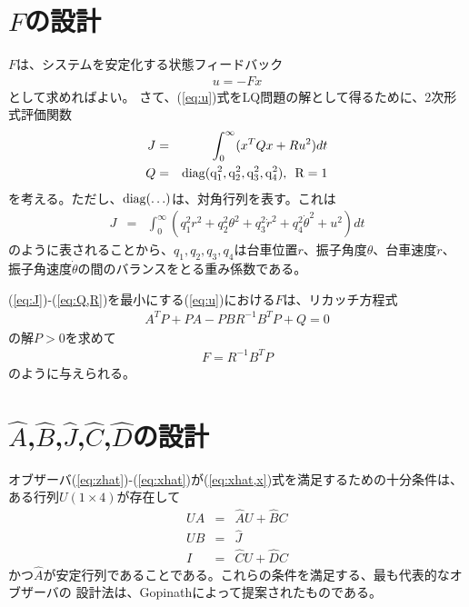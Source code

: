 \documentclass[a4j,11pt,twoside]{ujbook}
\begin{document}
	\section{$F$の設計}
		$F$は、システムを安定化する状態フィードバック
		\begin{eqnarray}
			u = -Fx
			\label{eq:u}
		\end{eqnarray}
		として求めればよい。
		さて、(\ref{eq:u})式をLQ問題の解として得るために、2次形式評価関数
		\begin{eqnarray}
			J &=& \int_0^\infty (x^TQx + Ru^2) dt
			\label{eq:J}\\
			Q &=& \rm{diag}(q^2_1,q^2_2,q^2_3,q^2_4), \,\,\, R = 1
			\label{eq:Q,R}
		\end{eqnarray}
		を考える。ただし、$\rm{diag}(\ldots)$は、対角行列を表す。これは
		\begin{eqnarray}
			J &=& \int_0^\infty (q^2_1r^2 + q^2_2\theta^2 + q^2_3\dot{r}^2 + q^2_4
			\dot{\theta}^2 + u^2) dt
		\end{eqnarray}
		のように表されることから、$q_1,q_2,q_3,q_4$は台車位置$r$、振子角度$\theta$、台車速度$\dot{r}$、振子角速度$\dot{\theta}$の間のバランスをとる重み係数である。
		
		(\ref{eq:J})-(\ref{eq:Q,R})を最小にする(\ref{eq:u})における$F$は、リカッチ方程式
		\begin{eqnarray*}
			A^TP + PA - PBR^{-1}B^TP + Q = 0
		\end{eqnarray*}
		の解$P > 0$を求めて
		\begin{eqnarray*}
			F = R^{-1}B^TP
		\end{eqnarray*}
		のように与えられる。
	
	\section{$\hat{A}$,$\hat{B}$,$\hat{J}$,$\hat{C}$,$\hat{D}$の設計}
		オブザーバ(\ref{eq:zhat})-(\ref{eq:xhat})が(\ref{eq:xhat,x})式を満足するための十分条件は、ある行列$U(1\times4)$が存在して
		\begin{eqnarray*}
			UA & = & \hat{A}U + \hat{B}C\\
			UB & = & \hat{J}\\
			I  & = & \hat{C}U + \hat{D}C
		\end{eqnarray*}
		かつ$\hat{A}$が安定行列であることである。これらの条件を満足する、最も代表的なオブザーバの
		設計法は、Gopinathによって提案されたものである。
		
\end{document}

